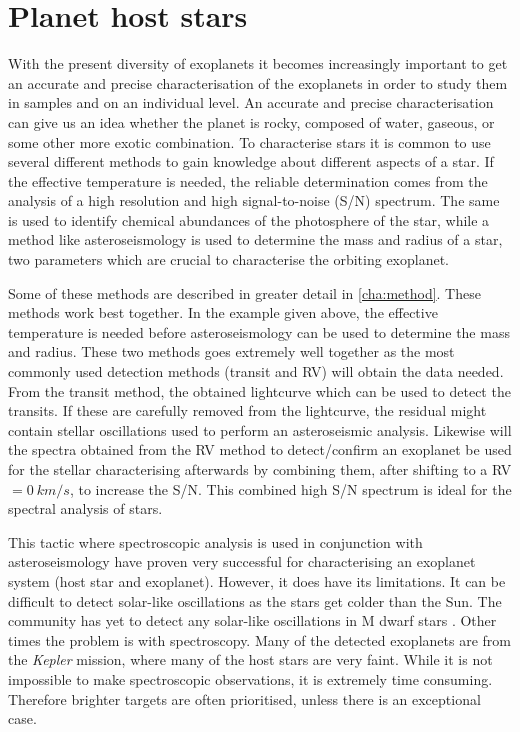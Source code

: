 \section{Planet host stars}
\label{sec:planet_host_stars}

With the present diversity of exoplanets it becomes increasingly important to get an accurate and
precise characterisation of the exoplanets in order to study them in samples and on an individual
level. An accurate and precise characterisation can give us an idea whether the planet is rocky,
composed of water, gaseous, or some other more exotic combination. To characterise stars it is
common to use several different methods to gain knowledge about different aspects of a star. If the
effective temperature is needed, the reliable determination comes from the analysis of a high
resolution and high signal-to-noise (S/N) spectrum. The same is used to identify chemical abundances
of the photosphere of the star, while a method like asteroseismology is used to determine the mass
and radius of a star, two parameters which are crucial to characterise the orbiting exoplanet.

Some of these methods are described in greater detail in \cref{cha:method}. These methods work best
together. In the example given above, the effective temperature is needed before asteroseismology
can be used to determine the mass and radius. These two methods goes extremely well together as the
most commonly used detection methods (transit and RV) will obtain the data needed. From the transit
method, the obtained lightcurve which can be used to detect the transits. If these are carefully
removed from the lightcurve, the residual might contain stellar oscillations used to perform an
asteroseismic analysis. Likewise will the spectra obtained from the RV method to detect/confirm an
exoplanet be used for the stellar characterising afterwards by combining them, after shifting to a
RV$=\SI{0}{km/s}$, to increase the S/N. This combined high S/N spectrum is ideal for the spectral
analysis of stars.

This tactic where spectroscopic analysis is used in conjunction with asteroseismology have proven
very successful \citep[see e.g.][]{Huber2013} for characterising an exoplanet system (host star and
exoplanet). However, it does have its limitations. It can be difficult to detect solar-like
oscillations as the stars get colder than the Sun. The community has yet to detect any solar-like
oscillations in M dwarf stars \citep{Rodriguez2016,Berdinas2017}. Other times the problem is with
spectroscopy. Many of the detected exoplanets are from the \emph{Kepler} mission, where many of the
host stars are very faint. While it is not impossible to make spectroscopic observations, it is
extremely time consuming. Therefore brighter targets are often prioritised, unless there is an
exceptional case.

